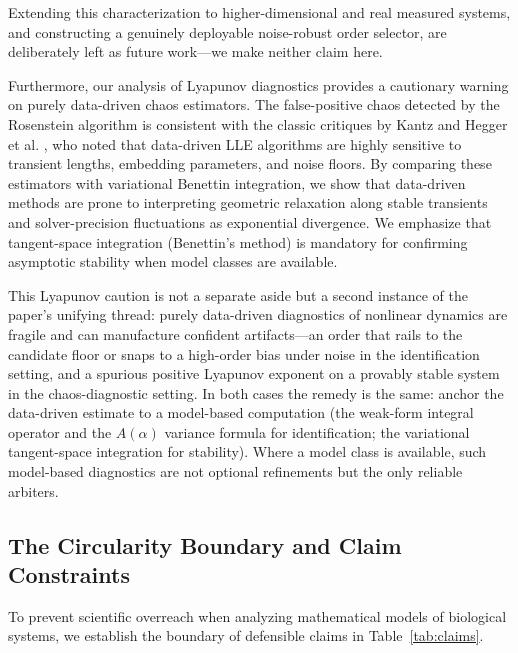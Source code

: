 \documentclass[review,3p,times]{elsarticle}
\begin{document}
Extending this characterization to higher-dimensional and real measured systems, and constructing a genuinely deployable noise-robust order selector, are deliberately left as future work---we make neither claim here.

Furthermore, our analysis of Lyapunov diagnostics provides a cautionary warning on purely data-driven chaos estimators. The false-positive chaos detected by the Rosenstein algorithm \cite{rosenstein1993practical} is consistent with the classic critiques by Kantz \cite{kantz1994robust} and Hegger et al. \cite{hegger1999practical}, who noted that data-driven LLE algorithms are highly sensitive to transient lengths, embedding parameters, and noise floors. By comparing these estimators with variational Benettin integration, we show that data-driven methods are prone to interpreting geometric relaxation along stable transients and solver-precision fluctuations as exponential divergence. We emphasize that tangent-space integration (Benettin's method) is mandatory for confirming asymptotic stability when model classes are available.

This Lyapunov caution is not a separate aside but a second instance of the paper's unifying thread: purely data-driven diagnostics of nonlinear dynamics are fragile and can manufacture confident artifacts---an order that rails to the candidate floor or snaps to a high-order bias under noise in the identification setting, and a spurious positive Lyapunov exponent on a provably stable system in the chaos-diagnostic setting. In both cases the remedy is the same: anchor the data-driven estimate to a model-based computation (the weak-form integral operator and the $A(\alpha)$ variance formula for identification; the variational tangent-space integration for stability). Where a model class is available, such model-based diagnostics are not optional refinements but the only reliable arbiters.

\subsection{The Circularity Boundary and Claim Constraints}
To prevent scientific overreach when analyzing mathematical models of biological systems, we establish the boundary of defensible claims in Table~\ref{tab:claims}. 
\end{document}
